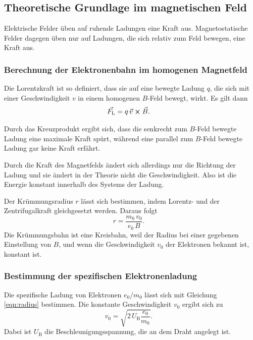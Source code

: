 \subsection{Theoretische Grundlage im magnetischen Feld}
Elektrische Felder üben auf ruhende Ladungen 
eine Kraft aus. Magnetostatische Felder dagegen üben nur auf 
Ladungen, die sich relativ zum Feld bewegen, eine Kraft aus.

\subsubsection{Berechnung der Elektronenbahn im homogenen Magnetfeld}
Die Lorentzkraft ist so definiert, dass sie auf eine bewegte Ladung $q$, die sich mit einer Geschwindigkeit $v$ in einem homogenen $B$-Feld bewegt, wirkt. Es gilt dann 
\begin{equation}
    \vec{F_\text{L}}= q \, \vec{v} \cross \vec{B}.
    \label{eqn:Lorentz}
\end{equation}

\noindent Durch das Kreuzprodukt ergibt sich, dass die senkrecht zum $B$-Feld bewegte Ladung eine maximale Kraft spürt, während eine parallel zum $B$-Feld bewegte Ladung gar keine Kraft erfährt.

\noindent Durch die Kraft des Magnetfelds ändert sich allerdings nur die Richtung der Ladung und sie ändert 
in der Theorie nicht die Geschwindigkeit. Also ist die Energie konstant 
innerhalb des Systems der Ladung.

\noindent Der Krümmungsradius $r$ lässt sich bestimmen, indem Lorentz- und der Zentrifugalkraft gleichgesetzt werden. Daraus folgt
\begin{equation}
    r= \frac{m_\text{0} \, v_\text{0}}{e_\text{0} \, B}.
    \label{eqn:radius}
\end{equation}
Die Krümmungsbahn ist eine Kreisbahn, weil der Radius
bei einer gegebenen Einstellung von $B$, und wenn die Geschwindigkeit $v_0$ der Elektronen bekannt ist, konstant ist. 

\subsubsection{Bestimmung der spezifischen Elektronenladung}

Die spezifische 
Ladung von Elektronen $e_\text{0}/m_\text{0}$ lässt sich
mit Gleichung \eqref{eqn:radius} bestimmen. 
Die konstante Geschwindigkeit $v_\text{0}$ ergibt sich zu 
\begin{equation*}
    v_\text{0}= \sqrt{2 \, U_\text{B} \frac{e_\text{0}}{m_\text{0}}}.
\end{equation*}
Dabei ist $U_\text{B}$ die Beschleunigungsspannung, die an dem Draht angelegt ist.

